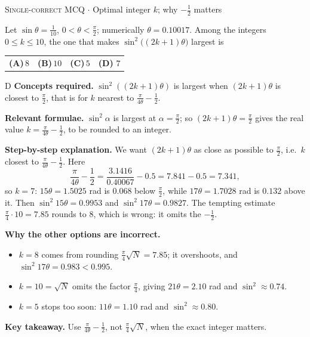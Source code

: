 \documentclass[11pt,a4paper]{article}
\newcommand{\optlabel}[1]{\textbf{(#1)}}
\newcommand{\correctlabel}[1]{\textcolor{okgreen}{\textbf{(#1)}\,\ding{51}}}
\newenvironment{qitem}[1]{\begin{list}{}{\setlength{\leftmargin}{3.3em}\setlength{\labelwidth}{3.1em}%
  \setlength{\labelsep}{0.2em}\setlength{\topsep}{3pt}\setlength{\parsep}{3pt}}\item[\textbf{Q.#1}\hfill]}{\end{list}}
\newcommand{\qsep}{\par\vspace{2pt}{\color{black!15}\hrule}\vspace{4pt}}
\newcommand{\qmeta}[2]{{\footnotesize\color{black!60}\textsc{#1} \;$\cdot$\; #2}\par}
\begin{document}
\begin{qitem}{6}
\qmeta{Single-correct MCQ}{Optimal integer $k$; why $-\frac12$ matters}
Let $\sin\theta = \tfrac{1}{10}$, $0 < \theta < \tfrac\pi2$; numerically $\theta = 0.10017$. Among the integers $0 \le k \le 10$, the one that makes
$\sin^2\big((2k+1)\theta\big)$ largest is
\par\smallskip\noindent\begin{tabularx}{\linewidth}{@{}*{4}{L}@{}}
\optlabel{A}\,$8$ & \optlabel{B}\,$10$ & \optlabel{C}\,$5$ & \correctlabel{D}\,$7$
\end{tabularx}
\end{qitem}
\begin{solbox}{D}
\textbf{\color{brand}Concepts required.} $\sin^2((2k+1)\theta)$ is largest when $(2k+1)\theta$ is closest to $\frac\pi2$, that is for $k$ nearest to $\frac{\pi}{4\theta} - \frac12$.

\textbf{\color{brand}Relevant formulae.} $\sin^2\alpha$ is largest at $\alpha = \frac\pi2$; so $(2k+1)\theta = \frac\pi2$ gives the real value $k = \frac{\pi}{4\theta} - \frac12$, to be rounded to an integer.

\textbf{\color{brand}Step-by-step explanation.} We want $(2k+1)\theta$ as close as possible to $\frac\pi2$, i.e.\ $k$ closest to $\frac{\pi}{4\theta} - \frac12$. Here
\[ \frac{\pi}{4\theta} - \frac12 = \frac{3.1416}{0.40067} - 0.5 = 7.841 - 0.5 = 7.341, \]
so $k = 7$: $15\theta = 1.5025$ rad is $0.068$ below $\frac\pi2$, while $17\theta = 1.7028$ rad is $0.132$ above it. Then
$\sin^2 15\theta = 0.9953$ and $\sin^2 17\theta = 0.9827$.
The tempting estimate $\frac\pi4\cdot 10 = 7.85$ rounds to $8$, which is wrong: it omits the $-\frac12$.

\textbf{\color{brand}Why the other options are incorrect.}
\begin{itemize}[leftmargin=2.4em, itemsep=1pt, topsep=2pt]
\item[\textbf{(A)}] $k = 8$ comes from rounding $\frac\pi4\sqrt N = 7.85$; it overshoots, and $\sin^2 17\theta = 0.983 < 0.995$.
\item[\textbf{(B)}] $k = 10 = \sqrt N$ omits the factor $\frac\pi4$, giving $21\theta = 2.10$ rad and $\sin^2 \approx 0.74$.
\item[\textbf{(C)}] $k = 5$ stops too soon: $11\theta = 1.10$ rad and $\sin^2 \approx 0.80$.
\end{itemize}
\textbf{\color{brand}Key takeaway.} Use $\frac{\pi}{4\theta} - \frac12$, not $\frac\pi4\sqrt N$, when the exact integer matters.
\end{solbox}
\qsep
\end{document}

